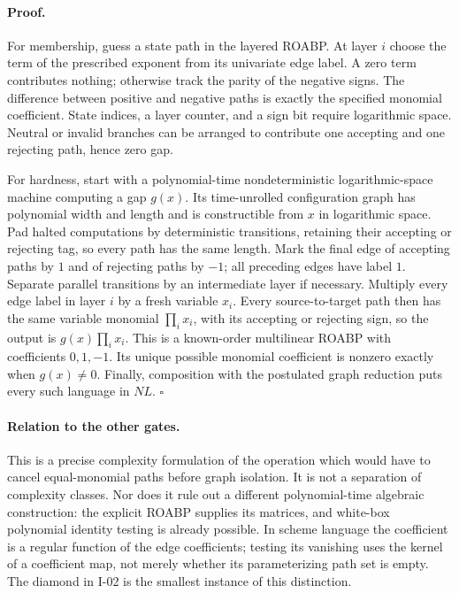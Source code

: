 \paragraph{Proof.}
For membership, guess a state path in the layered ROABP.  At layer
$i$ choose the term of the prescribed exponent from its univariate
edge label.  A zero term contributes nothing; otherwise track the
parity of the negative signs.  The difference between positive and
negative paths is exactly the specified monomial coefficient.
State indices, a layer counter, and a sign bit require logarithmic
space.  Neutral or invalid branches can be arranged to contribute
one accepting and one rejecting path, hence zero gap.

For hardness, start with a polynomial-time nondeterministic
logarithmic-space machine computing a gap $g(x)$.  Its time-unrolled
configuration graph has polynomial width and length and is
constructible from $x$ in logarithmic space.  Pad halted computations
by deterministic transitions, retaining their accepting or rejecting
tag, so every path has the same length.  Mark the final edge
of accepting paths by $1$ and of rejecting paths by $-1$;
all preceding edges have label $1$.  Separate parallel transitions
by an intermediate layer if necessary.  Multiply every edge label
in layer $i$ by a fresh variable $x_i$.  Every source-to-target path
then has the same variable monomial $\prod_i x_i$, with its
accepting or rejecting sign, so the output is
$g(x)\prod_i x_i$.  This is a known-order multilinear ROABP with
coefficients $0,1,-1$.  Its unique possible monomial coefficient
is nonzero exactly when $g(x)\ne0$.  Finally, composition with the
postulated graph reduction puts every such language in $NL$.
\hfill$\square$

\paragraph{Relation to the other gates.}
This is a precise complexity formulation of the operation which
would have to cancel equal-monomial paths before graph isolation.
It is not a separation of complexity classes.  Nor does it rule
out a different polynomial-time algebraic construction: the
explicit ROABP supplies its matrices, and white-box polynomial
identity testing is already possible.  In scheme language the
coefficient is a regular function of the edge coefficients;
testing its vanishing uses the kernel of a coefficient map, not
merely whether its parameterizing path set is empty.  The diamond
in I-02 is the smallest instance of this distinction.


